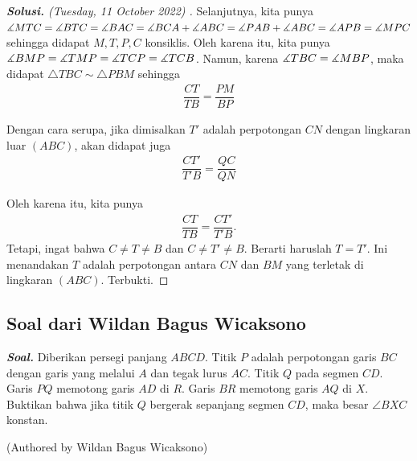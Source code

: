 \documentclass[letterpaper, 13pt]{scrartcl}
\begin{document}
\begin{proof}[\textbf{Solusi. }(Tuesday, 11 October 2022) ]
Selanjutnya, kita punya $\measuredangle MTC = \measuredangle BTC = \measuredangle BAC = \measuredangle BCA + \measuredangle ABC = \measuredangle PAB + \measuredangle ABC = \measuredangle APB = \measuredangle MPC$ sehingga didapat $M,T,P,C$ konsiklis. Oleh karena itu, kita punya $\measuredangle BMP = \measuredangle TMP = \measuredangle TCP = \measuredangle TCB$. Namun, karena $\measuredangle TBC = \measuredangle MBP$, maka didapat $\triangle TBC \sim \triangle PBM$ sehingga
\begin{align*}
    \dfrac{CT}{TB} = \dfrac{PM}{BP}
\end{align*}

Dengan cara serupa, jika dimisalkan $T'$ adalah perpotongan $CN$  dengan lingkaran luar $(ABC)$,  akan didapat juga
\begin{align*}
    \dfrac{CT'}{T'B} = \dfrac{QC}{QN}
\end{align*}

Oleh karena itu, kita punya 
\begin{align*}
    \dfrac{CT}{TB} = \dfrac{CT'}{T'B}.
\end{align*}
Tetapi, ingat bahwa $C \neq T \neq B$ dan $C \neq T' \neq B$. Berarti haruslah $T=T'$. Ini menandakan $T$ adalah perpotongan antara $CN$ dan $BM$ yang terletak di lingkaran $(ABC)$. Terbukti.

\end{proof}

\subsection{Soal dari Wildan Bagus Wicaksono}

\textbf{\textit{Soal. }}Diberikan persegi panjang $ABCD$. Titik $P$ adalah perpotongan garis $BC$ dengan garis yang melalui $A$ dan tegak lurus $AC$. Titik $Q$ pada segmen $CD$. Garis $PQ$ memotong garis $AD$ di $R$. Garis $BR$ memotong garis $AQ$ di $X$. Buktikan bahwa jika titik $Q$ bergerak sepanjang segmen $CD$, maka besar $\angle BXC$ konstan.

(Authored by Wildan Bagus Wicaksono)
\end{document}
